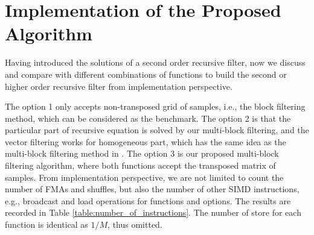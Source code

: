 \section{Implementation of the Proposed Algorithm}
\label{sec:implementation}

Having introduced the solutions of a second order recursive filter, now we discuss and compare with different
combinations of functions to build the second or higher order recursive filter from implementation perspective.

The option 1 only accepts non-transposed grid of samples, i.e., the block filtering method, which can be considered as the benchmark.
The option 2 is that the particular part of recursive equation is solved by our multi-block filtering, 
and the vector filtering works for homogeneous part, which 
has the same idea as the multi-block filtering method in \cite{Jaewoo_09}.
The option 3 is our proposed multi-block filtering algorithm,
where both functions accept the transposed matrix of samples.
From implementation perspective,
we are not limited to count the number of FMAs and shuffles,
but also the number of other SIMD instructions, 
e.g., broadcast and load operations for functions and options.
The results are recorded in Table \ref{table:number_of_instructions}.
The number of store for each function is identical as $1/M$, thus omitted. 
 
